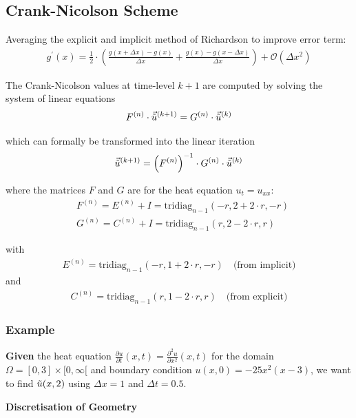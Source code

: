\subsection{Crank-Nicolson Scheme}

Averaging the explicit and implicit method of Richardson to improve error term:
\begin{align*}
	g^{\prime}(x)={\frac{1}{2}}\cdot\left({\frac{g(x+\Delta x)-g(x)}{\Delta x}}+{\frac{g(x)-g(x-\Delta x)}{\Delta x}}\right)
	+ \mathcal{O}(\Delta x^{2})
\end{align*}

The Crank-Nicolson values at time-level $k+1$ are computed by solving the system of linear equations
\begin{align*}
	F^{(n)}\cdot\vec{\tilde{u}}^{(k+1)} = G^{(n)}\cdot\vec{\tilde{u}}^{(k)}
\end{align*}

which can formally be transformed into the linear iteration
\begin{align*}
	\vec{\tilde{u}}^{(k+1)}=\left(F^{(n)}\right)^{-1}\cdot G^{(n)}\cdot\vec{\tilde{u}}^{(k)}
\end{align*}

where the matrices $F$ and $G$ are for the heat equation $u_t=u_{xx}$:
\begin{align*}
	& F^{(n)}=E^{(n)}+I=\mathrm{tridiag}_{n-1}(-r,2+2\cdot r,-r) \\
	& G^{(n)}=C^{(n)}+I=\mathrm{tridiag}_{n-1}(r,2-2\cdot r,r)
\end{align*}

with
\begin{align*}
	E^{(n)}=\mathrm{tridiag}_{n-1}(-r,1+2\cdot r,-r)	\quad\text{(from implicit)}
\end{align*}
and
\begin{align*}
	C^{(n)}=\mathrm{tridiag}_{n-1}(r,1-2\cdot r,r)\quad\text{(from explicit)}
\end{align*}

\subsubsection{Example}

\textbf{Given} the heat equation $\frac{\partial u}{\partial t}(x,t) = \frac{\partial^2 u}{\partial x^2}(x,t)$
for the domain $\Omega = [0,3]\times [0, \infty[$ and boundary condition
$u(x,0) = -25x^2(x-3)$, we want to find $\tilde{u}(x,2)$ using $\Delta x = 1$ and $\Delta t = 0.5$.

\textbf{Discretisation of Geometry}


